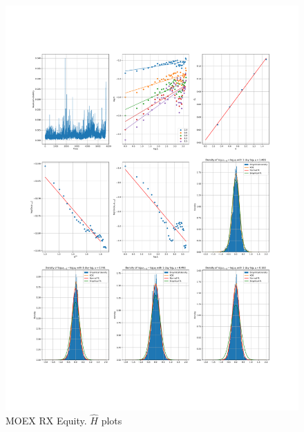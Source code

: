     \begin{figure}[h]
        \centering
        \includegraphics[width=\textwidth]{fig/MOEX RX Equity.pdf}
        \caption{MOEX RX Equity. $\hat{H}$ plots}
    \end{figure} 
        
